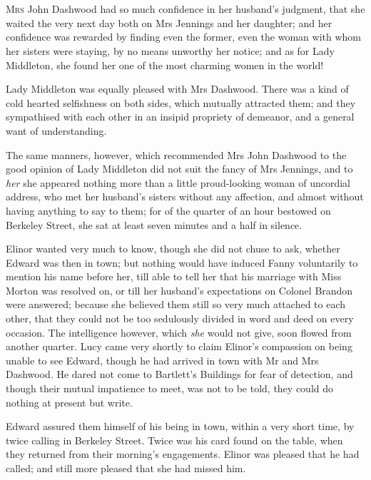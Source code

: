 \chapter[Chapter \thechapter]{}
\lettrine[lraise=0.3]{M}{rs} John Dashwood had so much confidence in her husband's judgment, that she waited the very next day both on Mrs Jennings and her daughter; and her confidence was rewarded by finding even the former, even the woman with whom her sisters were staying, by no means unworthy her notice; and as for Lady Middleton, she found her one of the most charming women in the world!

Lady Middleton was equally pleased with Mrs Dashwood. There was a kind of cold hearted selfishness on both sides, which mutually attracted them; and they sympathised with each other in an insipid propriety of demeanor, and a general want of understanding.

The same manners, however, which recommended Mrs John Dashwood to the good opinion of Lady Middleton did not suit the fancy of Mrs Jennings, and to \textit{her} she appeared nothing more than a little proud-looking woman of uncordial address, who met her husband's sisters without any affection, and almost without having anything to say to them; for of the quarter of an hour bestowed on Berkeley Street, she sat at least seven minutes and a half in silence.

Elinor wanted very much to know, though she did not chuse to ask, whether Edward was then in town; but nothing would have induced Fanny voluntarily to mention his name before her, till able to tell her that his marriage with Miss Morton was resolved on, or till her husband's expectations on Colonel Brandon were answered; because she believed them still so very much attached to each other, that they could not be too sedulously divided in word and deed on every occasion. The intelligence however, which \textit{she} would not give, soon flowed from another quarter. Lucy came very shortly to claim Elinor's compassion on being unable to see Edward, though he had arrived in town with Mr and Mrs Dashwood. He dared not come to Bartlett's Buildings for fear of detection, and though their mutual impatience to meet, was not to be told, they could do nothing at present but write.

Edward assured them himself of his being in town, within a very short time, by twice calling in Berkeley Street. Twice was his card found on the table, when they returned from their morning's engagements. Elinor was pleased that he had called; and still more pleased that she had missed him.

